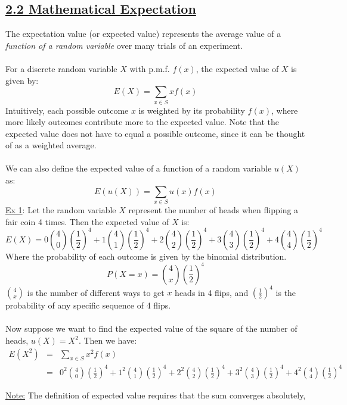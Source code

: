 ﻿\documentclass[12pt]{article}
\begin{document}
\subsection*{\underline{2.2 Mathematical Expectation}}
\begin{definition}
    The expectation value (or expected value) represents the average value of a \textit{function of a random variable} over many trials of an experiment.\\\\
    For a discrete random variable $X$ with p.m.f. $f(x)$, the expected value of $X$ is given by:
    \[E(X) = \sum_{x \in S} x f(x)\]
    Intuitively, each possible outcome $x$ is weighted by its probability $f(x)$, where more likely outcomes contribute more to the expected value. Note that the expected value does not have to equal a possible outcome, since it can be thought of as a weighted average.\\\\
    We can also define the expected value of a function of a random variable $u(X)$ as:
    \[E(u(X)) = \sum_{x \in S} u(x) f(x)\]
    \underline{Ex 1}: Let the random variable $X$ represent the number of heads when flipping a fair coin 4 times. Then the expected value of $X$ is:
    \[E(X) = 0\binom{4}{0} \left(\frac{1}{2}\right)^4 + 1\binom{4}{1} \left(\frac{1}{2}\right)^4 + 2\binom{4}{2} \left(\frac{1}{2}\right)^4 + 3\binom{4}{3} \left(\frac{1}{2}\right)^4 + 4\binom{4}{4} \left(\frac{1}{2}\right)^4\]
    Where the probability of each outcome is given by the binomial distribution.
    \[P(X=x) = \binom{4}{x} \left(\frac{1}{2}\right)^4\]
    $\binom{4}{x}$ is the number of different ways to get $x$ heads in 4 flips, and $\left(\frac{1}{2}\right)^4$ is the probability of any specific sequence of 4 flips.\\\\
    Now suppose we want to find the expected value of the square of the number of heads, $u(X) = X^2$. Then we have:
    \begin{eqnarray*}
    E(X^2) &=& \sum_{x\in S} x^2 f(x)\\
    &=& 0^2\binom{4}{0} \left(\frac{1}{2}\right)^4 + 1^2\binom{4}{1} \left(\frac{1}{2}\right)^4 + 2^2\binom{4}{2} \left(\frac{1}{2}\right)^4 + 3^2\binom{4}{3} \left(\frac{1}{2}\right)^4 + 4^2\binom{4}{4} \left(\frac{1}{2}\right)^4
    \end{eqnarray*}
\end{definition}
 \underline{Note:} The definition of expected value requires that the sum converges absolutely, 
\end{document}
